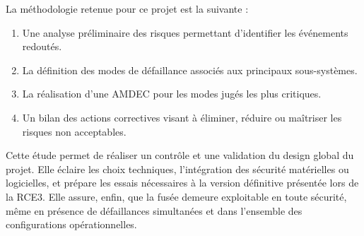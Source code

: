 La méthodologie retenue pour ce projet est la suivante :
\begin{enumerate}
    \item Une analyse préliminaire des risques permettant d’identifier les événements redoutés.
    \item La définition des modes de défaillance associés aux principaux sous-systèmes.
    \item La réalisation d’une \acrfull{AMDEC} pour les modes jugés les plus critiques.
    \item Un bilan des actions correctives visant à éliminer, réduire ou maîtriser les risques non acceptables.\\
\end{enumerate}
Cette étude permet de réaliser un contrôle et une validation du design global du projet. Elle éclaire les choix techniques,
l’intégration des sécurité matérielles ou logicielles, et prépare les essais nécessaires à la version définitive présentée lors
de la RCE3. Elle assure, enfin, que la fusée demeure exploitable en toute sécurité, même en présence de défaillances simultanées
et dans l'ensemble des configurations opérationnelles.

\newpage







\newpage
